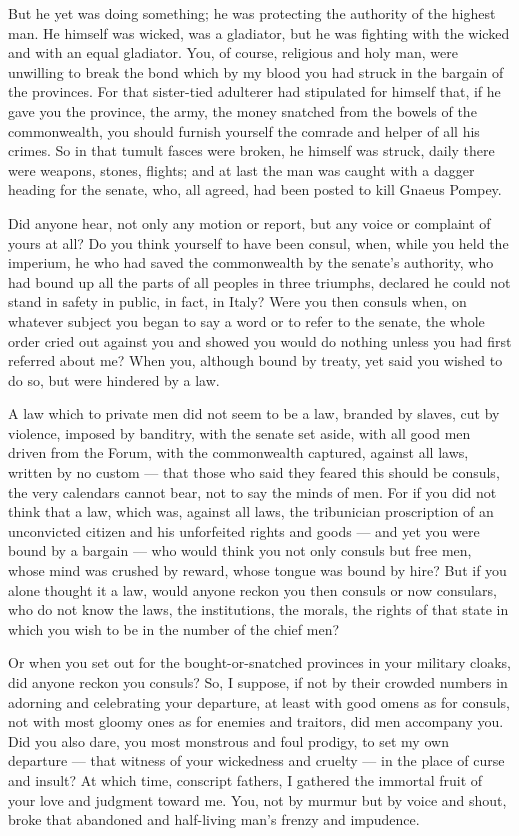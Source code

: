  But he yet was doing something; he was protecting the authority of the highest man. He himself was wicked, was a gladiator, but he was fighting with the wicked and with an equal gladiator. You, of course, religious and holy man, were unwilling to break the bond which by my blood you had struck in the bargain of the provinces. For that sister-tied adulterer had stipulated for himself that, if he gave you the province, the army, the money snatched from the bowels of the commonwealth, you should furnish yourself the comrade and helper of all his crimes. So in that tumult fasces were broken, he himself was struck, daily there were weapons, stones, flights; and at last the man was caught with a dagger heading for the senate, who, all agreed, had been posted to kill Gnaeus Pompey.

 Did anyone hear, not only any motion or report, but any voice or complaint of yours at all? Do you think yourself to have been consul, when, while you held the imperium, he who had saved the commonwealth by the senate's authority, who had bound up all the parts of all peoples in three triumphs, declared he could not stand in safety in public, in fact, in Italy? Were you then consuls when, on whatever subject you began to say a word or to refer to the senate, the whole order cried out against you and showed you would do nothing unless you had first referred about me? When you, although bound by treaty, yet said you wished to do so, but were hindered by a law.

 A law which to private men did not seem to be a law, branded by slaves, cut by violence, imposed by banditry, with the senate set aside, with all good men driven from the Forum, with the commonwealth captured, against all laws, written by no custom — that those who said they feared this should be consuls, the very calendars cannot bear, not to say the minds of men. For if you did not think that a law, which was, against all laws, the tribunician proscription of an unconvicted citizen and his unforfeited rights and goods — and yet you were bound by a bargain — who would think you not only consuls but free men, whose mind was crushed by reward, whose tongue was bound by hire? But if you alone thought it a law, would anyone reckon you then consuls or now consulars, who do not know the laws, the institutions, the morals, the rights of that state in which you wish to be in the number of the chief men?

 Or when you set out for the bought-or-snatched provinces in your military cloaks, did anyone reckon you consuls? So, I suppose, if not by their crowded numbers in adorning and celebrating your departure, at least with good omens as for consuls, not with most gloomy ones as for enemies and traitors, did men accompany you. Did you also dare, you most monstrous and foul prodigy, to set my own departure — that witness of your wickedness and cruelty — in the place of curse and insult? At which time, conscript fathers, I gathered the immortal fruit of your love and judgment toward me. You, not by murmur but by voice and shout, broke that abandoned and half-living man's frenzy and impudence.

